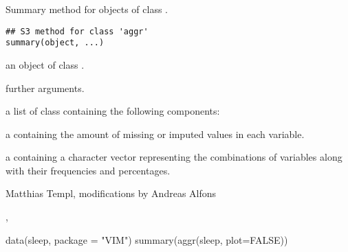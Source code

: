 %
\begin{Description}\relax
Summary method for objects of class .
\end{Description}
%
\begin{Usage}
\begin{verbatim}
## S3 method for class 'aggr'
summary(object, ...)
\end{verbatim}
\end{Usage}
%
\begin{Arguments}
\begin{ldescription}
\item[\code{object}] an object of class .
\item[\code{...}] further arguments.
\end{ldescription}
\end{Arguments}
%
\begin{Value}
a list of class  containing the following components:
\begin{ldescription}
\item[\code{missings}] a  containing the amount of missing or imputed values 
in each variable.
\item[\code{combinations}] a  containing a character vector 
representing the combinations of variables along with their frequencies 
and percentages.
\end{ldescription}
\end{Value}
%
\begin{Author}\relax
Matthias Templ, modifications by Andreas Alfons
\end{Author}
%
\begin{SeeAlso}\relax
{}, 
\end{SeeAlso}
%
\begin{Examples}
\begin{ExampleCode}
data(sleep, package = "VIM")
summary(aggr(sleep, plot=FALSE))
\end{ExampleCode}
\end{Examples}
